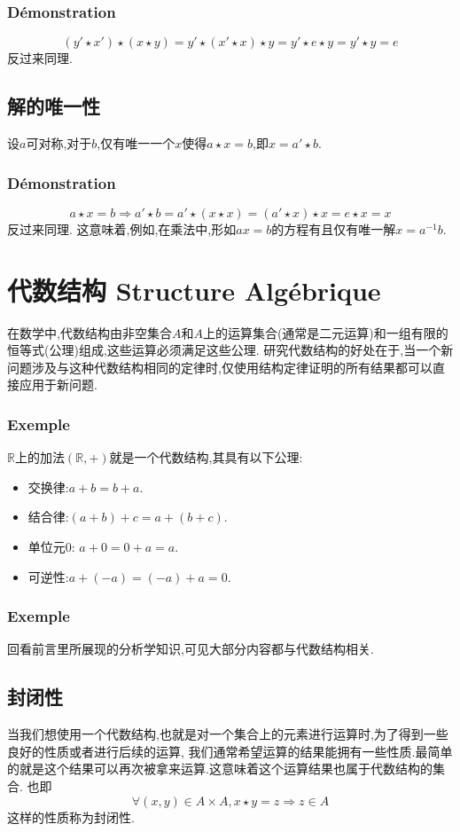 \documentclass[12pt, a4paper, oneside]{ctexbook}
\newcommand{\R }{\mathbb{R}}%
\begin{document}
  \subsubsection{Démonstration}
  $$
    (y'\star x')\star(x\star y)=y'\star (x'\star x)\star y=y'\star e\star y=y'\star y=e
  $$反过来同理.
  \subsection{解的唯一性}
  设$a$可对称,对于$b$,仅有唯一一个$x$使得$a\star x=b$,即$x=a'\star b$.
  \subsubsection{Démonstration}
  $$
    a\star x=b\Rightarrow a'\star b=a'\star (x\star x)=(a'\star x)\star x=e\star x=x
  $$反过来同理.
  这意味着,例如,在乘法中,形如$ax=b$的方程有且仅有唯一解$x=a^{-1}b$.

\section{代数结构 Structure Algébrique}
  在数学中,代数结构由非空集合$A$和$A$上的运算集合(通常是二元运算)和一组有限的恒等式(公理)组成,这些运算必须满足这些公理.
  研究代数结构的好处在于,当一个新问题涉及与这种代数结构相同的定律时,仅使用结构定律证明的所有结果都可以直接应用于新问题.
  \subsubsection{Exemple}
  $\R$上的加法$(\R,+)$就是一个代数结构,其具有以下公理:
  \begin{itemize}
    \item 交换律:$a+b=b+a$.
    \item 结合律:$(a+b)+c=a+(b+c)$.
    \item 单位元0:  $a+0=0+a=a$.
    \item 可逆性:$a+(-a)=(-a)+a=0$.
  \end{itemize}
  \subsubsection{Exemple}
  回看前言里所展现的分析学知识,可见大部分内容都与代数结构相关.
  \subsection{封闭性}
  当我们想使用一个代数结构,也就是对一个集合上的元素进行运算时,为了得到一些良好的性质或者进行后续的运算,
  我们通常希望运算的结果能拥有一些性质.最简单的就是这个结果可以再次被拿来运算.这意味着这个运算结果也属于代数结构的集合.
  也即$$\forall (x,y)\in A\times A, x\star y=z \Rightarrow z\in A$$这样的性质称为封闭性.
\end{document}
